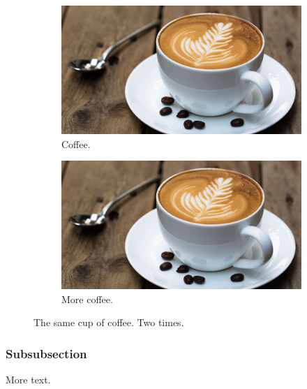 \documentclass{article}
\begin{document}
\begin{figure}[h!]
  \centering
  \begin{subfigure}[b]{0.4\linewidth}
    \includegraphics[width=\linewidth]{coffee.jpg}
    \caption{Coffee.}
  \end{subfigure}
  \begin{subfigure}[b]{0.4\linewidth}
    \includegraphics[width=\linewidth]{coffee.jpg}
    \caption{More coffee.}
  \end{subfigure}
  \caption{The same cup of coffee. Two times.}
  \label{fig:coffee}
\end{figure}

\subsubsection{Subsubsection}

More text.
\end{document}
